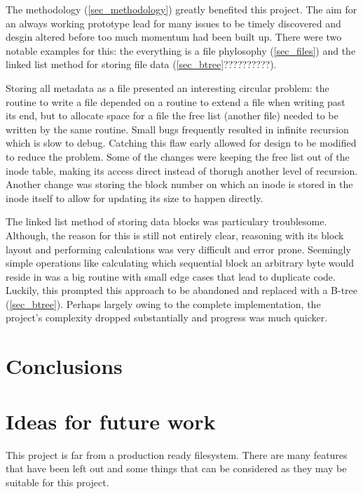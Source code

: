         The methodology (\ref{sec_methodology}) greatly benefited this project.
        The aim for an always working prototype lead for many issues to be
        timely discovered and desgin altered before too much momentum had been
        built up. There were two notable examples for this: the everything is a
        file phylosophy (\ref{sec_files}) and the linked list method for
        storing file data (\ref{sec_btree}??????????).

        Storing all metadata as a file presented an interesting circular
        problem: the routine to write a file depended on a routine to extend a
        file when writing past its end, but to allocate space for a file the
        free list (another file) needed to be written by the same routine.
        Small bugs frequently resulted in infinite recursion which is slow to
        debug. Catching this flaw early allowed for design to be modified to
        reduce the problem.  Some of the changes were keeping the free list out
        of the inode table, making its access direct instead of thorugh another
        level of recursion.  Another change was storing the block number on
        which an inode is stored in the inode itself to allow for updating its
        size to happen directly.

        The linked list method of storing data blocks was particulary
        troublesome. Although, the reason for this is still not entirely clear,
        reasoning with its block layout and performing calculations was very
        difficult and error prone. Seemingly simple operations like calculating
        which sequential block an arbitrary byte would reside in was a big
        routine with small edge cases that lead to duplicate code. Luckily,
        this prompted this approach to be abandoned and replaced with a B-tree
        (\ref{sec_btree}). Perhaps largely owing to the complete
        implementation, the project's complexity dropped substantially and
        progress was much quicker.

    \section{Conclusions}

    \section{Ideas for future work}

        This project is far from a production ready filesystem. There are many
        features that have been left out and some things that can be considered
        as they may be suitable for this project.

